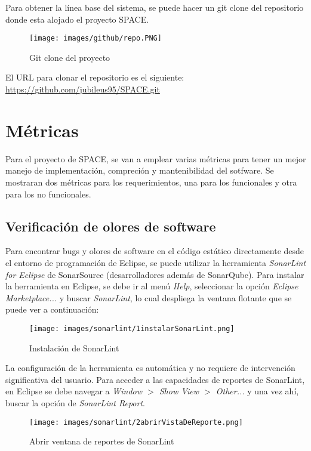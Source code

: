 \documentclass{scrreprt}
\begin{document}
Para obtener la línea base del sistema, se puede hacer un git clone del repositorio donde esta alojado el proyecto SPACE. 

\begin{figure}[H]
	\centering
    \texttt{[image: images/github/repo.PNG]}
    \caption{Git clone del proyecto}
\end{figure}

El URL para clonar el repositorio es el siguiente: \href{https://github.com/jubileus95/SPACE.git}{https://github.com/jubileus95/SPACE.git}

\chapter{Métricas}

Para el proyecto de SPACE, se van a emplear varias métricas para tener un mejor manejo de implementación, compreción y mantenibilidad del sotfware. Se mostraran dos métricas para los requerimientos, una para los funcionales y otra para los no funcionales.

\section{Verificación de olores de software}

Para encontrar bugs y olores de software en el código estático directamente desde el entorno de programación de Eclipse, se puede utilizar la herramienta \textit{SonarLint for Eclipse} de SonarSource (desarrolladores además de SonarQube). Para instalar la herramienta en Eclipse, se debe ir al menú \textit{Help}, seleccionar la opción \textit{Eclipse Marketplace...} y buscar \textit{SonarLint}, lo cual despliega la ventana flotante que se puede ver a continuación:

\begin{figure}[H]
	\centering
    \texttt{[image: images/sonarlint/1instalarSonarLint.png]}
    \caption{Instalación de SonarLint}
\end{figure}

La configuración de la herramienta es automática y no requiere de intervención significativa del usuario. Para acceder a las capacidades de reportes de SonarLint, en Eclipse se debe navegar a \textit{Window $>$ Show View $>$ Other...} y una vez ahí, buscar la opción de \textit{SonarLint Report}.

\begin{figure}[H]
	\centering
    \texttt{[image: images/sonarlint/2abrirVistaDeReporte.png]}
    \caption{Abrir ventana de reportes de SonarLint}
\end{figure}
\end{document}
